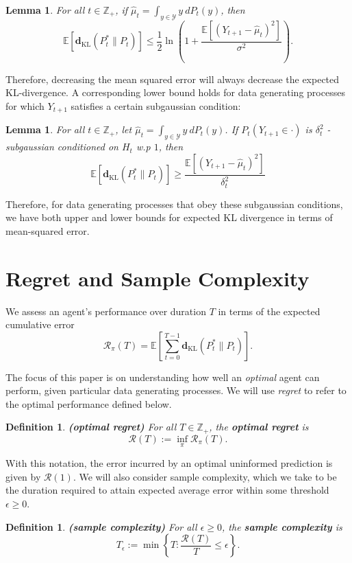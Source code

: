 \documentclass[twoside,11pt]{article}
\newtheorem{lemma}[theorem]{Lemma}
\newtheorem{definition}[theorem]{Definition}
\def\regret{\mathcal{R}}
\def\KL{\mathbf{d}_{\mathrm{KL}}}
\def\E{\mathbb{E}}
\begin{document}
\begin{lemma}
    For all $t \in \mathbb{Z}_{+}$, if $\hat{\mu}_t = \int_{y\in\mathcal{Y}} y\ dP_t(y)$, then
    $$\E\left[\KL(P_t^*\|P_t)\right] \leq \frac{1}{2}\ln\left(1 + \frac{\E\left[\left(Y_{t+1} - \hat{\mu}_t\right)^2\right]}{\sigma^2}\right).$$
\end{lemma}
Therefore, decreasing the mean squared error will always decrease the expected KL-divergence. A corresponding lower bound holds for data generating processes for which $Y_{t+1}$ satisfies a certain subgaussian condition:
\begin{lemma}
    For all $t \in \mathbb{Z}_{+}$, let $\hat{\mu}_t = \int_{y\in\mathcal{Y}} y\ dP_t(y)$. If $P_t(Y_{t+1}\in\cdot)$ is $\delta_t^2$ -subgaussian conditioned on $H_t$ w.p $1$, then
    $$\E\left[\KL(P^*_t\|P_t)\right] \geq \frac{\E\left[(Y_{t+1} - \hat{\mu}_t)^2\right]}{\delta^2_t}$$
\end{lemma}
Therefore, for data generating processes that obey these subgaussian conditions, we have both upper and lower bounds for expected KL divergence in terms of mean-squared error.


\section{Regret and Sample Complexity}
We assess an agent's performance over duration $T$ in terms of the expected cumulative error
$$\regret_\pi(T) = \E\left[\sum_{t=0}^{T-1} \KL(P^*_t \| P_t)\right].$$

The focus of this paper is on understanding how well an {\it optimal} agent can perform, given particular data generating processes.  We will use \emph{regret} to refer to the optimal performance defined below.
\begin{definition} {\bf (optimal regret)}
    For all $T\in\mathbb{Z}_{+}$, the \textbf{optimal regret} is
    $$\regret(T) := \inf_\pi \regret_\pi(T).$$
\end{definition}
With this notation, the error incurred by an optimal uninformed prediction is given by $\regret(1)$.  We will also consider sample complexity, which we take to be the duration required to attain expected average error within some threshold $\epsilon \geq 0$.

\begin{definition} {\bf (sample complexity)}
  \label{def:sample-complexity}
    For all $\epsilon \geq 0$, the \textbf{sample complexity} is
    $$T_\epsilon := \min\left\{T: \frac{\regret(T)}{T}  \leq \epsilon \right\}.$$
\end{definition}
\end{document}
